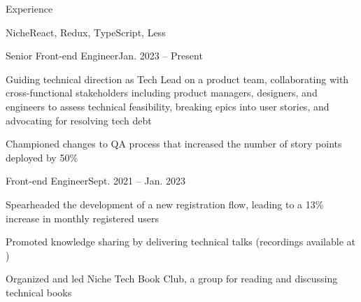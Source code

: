 \documentclass{resume} %
\begin{document}

\begin{rSection}{Experience}
\begin{rCompany}{Niche}{React, Redux, TypeScript, Less}{}{}
\begin{rPromotion}{}{}{Senior Front-end Engineer}{Jan. 2023 – Present}
\item Guiding technical direction as Tech Lead on a product team, collaborating with cross-functional stakeholders including product managers, designers, and engineers to assess technical feasibility, breaking epics into user stories, and advocating for resolving tech debt
\item Championed changes to QA process that increased the number of story points deployed by 50\%
\end{rPromotion}


\begin{rRole}{}{}{Front-end Engineer}{Sept. 2021 – Jan. 2023}
\item Spearheaded the development of a new registration flow, leading to a 13\% increase in monthly registered users
\item Promoted knowledge sharing by delivering technical talks (recordings available at \href{http://jgs.lol/}{})
\item Organized and led Niche Tech Book Club, a group for reading and discussing technical books
\end{rRole}
\end{rCompany}



\end{rSection}
\end{document}
